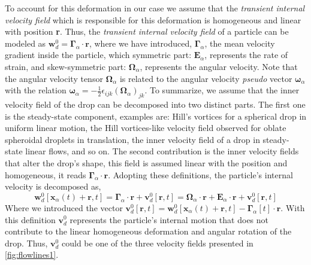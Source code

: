 To account for this deformation in our case we assume that the \textit{transient internal velocity field} which is responsible for this deformation is homogeneous and linear with position \textbf{r}. 
Thus, the \textit{transient internal velocity field} of a particle can be modeled as $\textbf{w}_d^0 = \bm\Gamma_\alpha \cdot \textbf{r}$, where we have introduced, $\bm\Gamma_\alpha$, the mean velocity gradient inside the particle, which symmetric part: $\textbf{E}_\alpha$, represents the rate of strain, and skew-symmetric part: $\bm\Omega_\alpha$, represents the angular velocity. 
Note that the angular velocity tensor $\bm\Omega_\alpha$ is related to the angular velocity \textit{pseudo} vector $\bm\omega_\alpha$ with the relation $\bm\omega_\alpha = -\frac{1}{2}\epsilon_{ijk} (\bm\Omega_\alpha)_{jk}$. 
To summarize, we assume that the inner velocity field of the drop can be decomposed into two distinct parts. 
The first one is the steady-state component, examples are: Hill's vortices for a spherical drop in uniform linear motion, the Hill vortices-like velocity field observed for oblate spheroidal droplets in translation,  the inner velocity field of a drop in steady-state linear flows, and so on.  
The second contribution is the inner velocity fields that alter the drop's shape, this field is assumed linear with the position and homogeneous, it reads  $\bm\Gamma_\alpha\cdot \textbf{r}$. 
Adopting these definitions, the particle's internal velocity is decomposed as, 
\begin{equation}
    \textbf{w}_{d}^0[\textbf{x}_\alpha(t)+\textbf{r},t]
    = \bm\Gamma_{\alpha} \cdot \textbf{r}
    + \textbf{v}^0_{d}[\textbf{r},t]
    =\bm{\Omega}_{\alpha}\cdot \textbf{r}
    + \textbf{E}_{\alpha} \cdot \textbf{r}
    + \textbf{v}^0_{d}[\textbf{r},t]
    \label{eq:def_vel}
\end{equation}
Where we introduced the vector $\textbf{v}^0_d[\textbf{r},t] =\textbf{w}^{0}_{d}[\textbf{x}_\alpha(t)+\textbf{r},t]  - \bm\Gamma_{\alpha}[t] \cdot \textbf{r}$.
With this definition $\textbf{v}_d^0$ represents the particle's internal motion that does not contribute to the linear homogeneous deformation and angular rotation of the drop. 
Thus, $\textbf{v}_d^0$ could be one of the three velocity fields presented in \ref{fig:flowlines1}. 

